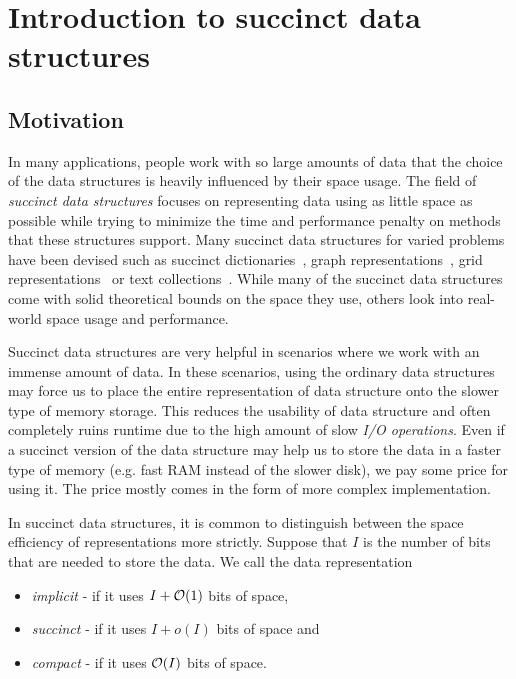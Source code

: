 \chapter{Introduction to succinct data structures}
\label{kap:kap1}


\section{Motivation}

In many applications, people work with so large amounts of data that the choice of
the data structures is heavily influenced by their space usage. The field
of \textit{succinct data structures} focuses on representing data using as little
space as possible while trying to minimize the time and performance penalty on methods
that these structures support. Many succinct data structures for varied problems
have been devised such as succinct dictionaries~\citep{raman2007succinct},
graph representations~\citep{farzan2013succinct}, grid representations~\citep{chazelle1988functional}
or text collections~\citep{ferragina2000opportunistic}. While many of the succinct
data structures come with solid theoretical bounds on the space they use, others look
into real-world space usage and performance.

Succinct data structures are very helpful in scenarios where we work with an immense amount
of data. In these scenarios, using the ordinary data structures may force us to place
the entire representation of data structure onto the slower type of memory storage. This
reduces the usability of data structure and often completely ruins runtime due to the
high amount of slow \textit{I/O operations}. Even if a succinct version of the data structure
may help us to store the data in a faster type of memory (e.g. fast RAM instead of the slower disk),
we pay some price for using it. The price mostly comes in the form of more complex implementation.

In succinct data structures, it is common to distinguish between the space efficiency of
representations more strictly. Suppose that $I$ is the number of bits that are needed to
store the data. We call the data representation
\begin{itemize}
	\item \textit{implicit} - if it uses $I + \mathcal{O}(1)$ bits of space,
	\item \textit{succinct} - if it uses $I + o(I)$ bits of space and
	\item \textit{compact} - if it uses $\mathcal{O}(I)$ bits of space.
\end{itemize}

